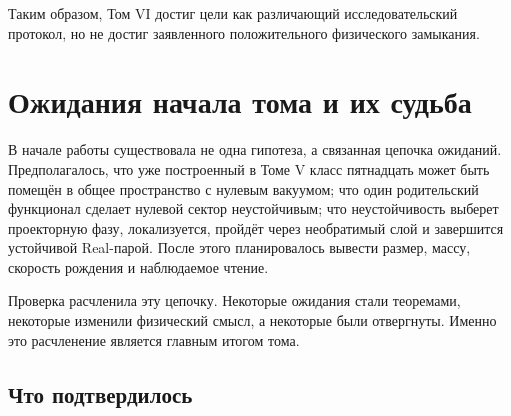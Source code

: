 Таким образом, Том VI достиг цели как различающий исследовательский
протокол, но не достиг заявленного положительного физического замыкания.

\section{Ожидания начала тома и их судьба}

В начале работы существовала не одна гипотеза, а связанная цепочка
ожиданий. Предполагалось, что уже построенный в Томе V класс пятнадцать
может быть помещён в общее пространство с нулевым вакуумом; что один
родительский функционал сделает нулевой сектор неустойчивым; что
неустойчивость выберет проекторную фазу, локализуется, пройдёт через
необратимый слой и завершится устойчивой Real-парой. После этого
планировалось вывести размер, массу, скорость рождения и наблюдаемое
чтение.

Проверка расчленила эту цепочку. Некоторые ожидания стали теоремами,
некоторые изменили физический смысл, а некоторые были отвергнуты. Именно
это расчленение является главным итогом тома.

\subsection{Что подтвердилось}

